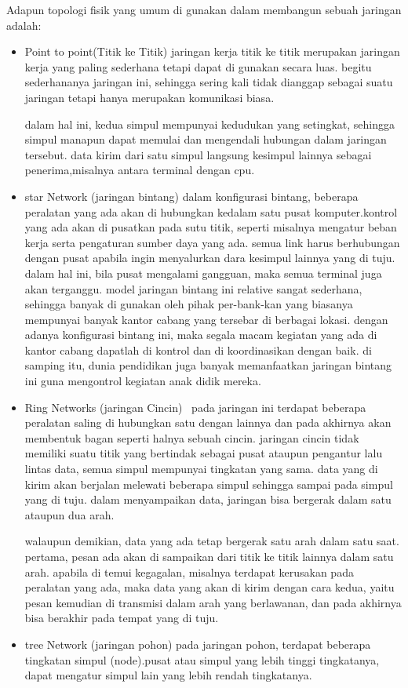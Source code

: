 Adapun topologi fisik yang umum di gunakan dalam membangun sebuah jaringan adalah:
\begin{itemize}
  \item Point to point(Titik ke Titik)
        jaringan kerja titik ke titik merupakan jaringan kerja yang paling sederhana tetapi dapat di gunakan secara luas. begitu sederhananya jaringan ini, sehingga sering kali tidak dianggap sebagai suatu jaringan tetapi hanya merupakan komunikasi biasa.

        dalam hal ini, kedua simpul mempunyai kedudukan yang setingkat, sehingga simpul manapun dapat memulai dan mengendali hubungan dalam jaringan tersebut. data kirim dari satu simpul langsung kesimpul lainnya sebagai penerima,misalnya antara terminal dengan cpu.
  \item  star Network (jaringan bintang)
         dalam konfigurasi bintang, beberapa peralatan yang ada akan di hubungkan kedalam satu pusat komputer.kontrol yang ada akan di pusatkan pada sutu titik, seperti misalnya mengatur beban kerja serta pengaturan sumber daya yang ada. semua link harus berhubungan dengan pusat apabila ingin menyalurkan dara kesimpul lainnya yang di tuju. dalam hal ini, bila pusat mengalami gangguan, maka semua terminal juga akan terganggu. model jaringan bintang ini relative sangat sederhana, sehingga banyak di gunakan oleh pihak per-bank-kan yang biasanya mempunyai banyak kantor cabang yang tersebar di berbagai lokasi. dengan adanya konfigurasi bintang ini, maka segala macam kegiatan yang ada di kantor cabang dapatlah di kontrol dan di koordinasikan dengan baik. di samping itu, dunia pendidikan juga banyak memanfaatkan jaringan bintang ini guna mengontrol kegiatan anak didik mereka.
  \item Ring Networks (jaringan Cincin)
  \     pada jaringan ini terdapat beberapa peralatan saling
        di hubungkan satu dengan lainnya dan pada akhirnya akan membentuk bagan seperti halnya sebuah cincin. jaringan cincin tidak memiliki suatu titik yang bertindak sebagai pusat ataupun pengantur lalu lintas data, semua simpul mempunyai tingkatan yang sama. data yang di kirim akan berjalan melewati beberapa simpul sehingga sampai pada simpul yang di tuju. dalam menyampaikan data, jaringan bisa bergerak dalam satu ataupun dua arah.

        walaupun demikian, data yang ada tetap bergerak satu arah dalam satu saat. pertama, pesan ada akan di sampaikan dari titik ke titik lainnya dalam satu arah. apabila di temui kegagalan, misalnya terdapat kerusakan pada peralatan yang ada, maka data yang akan di kirim dengan cara kedua, yaitu pesan kemudian di transmisi dalam arah yang berlawanan, dan pada akhirnya bisa berakhir pada tempat yang di tuju.
  \item tree Network (jaringan pohon)
        pada jaringan pohon, terdapat beberapa tingkatan simpul (node).pusat atau simpul yang lebih tinggi tingkatanya, dapat mengatur simpul lain yang lebih rendah tingkatanya.
\end{itemize}

